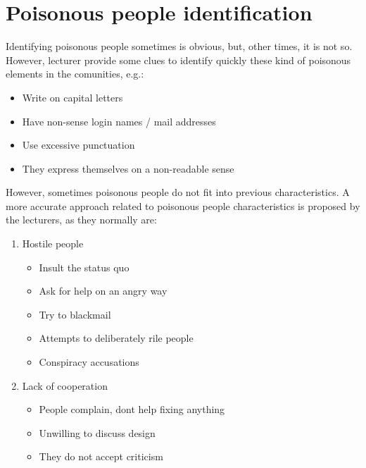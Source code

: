 \documentclass[11pt]{article}
\begin{document}
\section{Poisonous people identification}
Identifying poisonous people sometimes is obvious, but, other times, it is not so. However, lecturer provide some clues to identify quickly these kind of poisonous elements in the comunities, e.g.:
\begin{itemize}\itemsep0pt
\item{Write on capital letters}
\item{Have non-sense login names / mail addresses}
\item{Use excessive punctuation}
\item{They express themselves on a non-readable sense}
\end{itemize}
However, sometimes poisonous people do not fit into previous characteristics. A more accurate approach related to poisonous people characteristics is proposed by the lecturers, as they normally are:
\begin{enumerate}
\item{Hostile people}
\begin{itemize}\itemsep0pt
\item{Insult the status quo}
\item{Ask for help on an angry way}
\item{Try to blackmail}
\item{Attempts to deliberately rile people}
\item{Conspiracy accusations}
\end{itemize}
\item{Lack of cooperation}
\begin{itemize}\itemsep0pt
\item{People complain, dont help fixing anything}
\item{Unwilling to discuss design}
\item{They do not accept criticism}
\end{itemize}
\end{enumerate}
\end{document}

